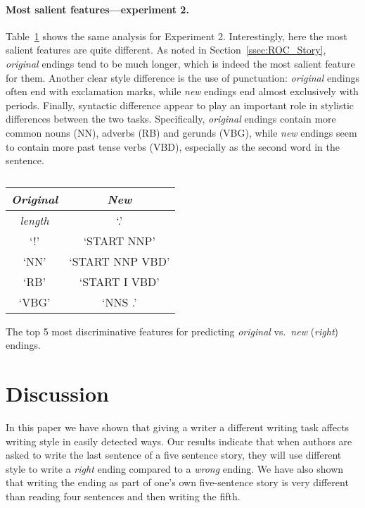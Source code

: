 \documentclass[11pt,a4paper]{article}
\newcommand{\secref}[1]{Section~\ref{ssec:#1}}
\newcommand{\tabref}[1]{Table~\ref{#1}}
\newcommand{\isectionb}[1]{\section{#1}\label{ssec:#1}}
\begin{document}
\paragraph{Most salient features---experiment 2.}
\tabref{exp2_features} shows the same analysis for Experiment 2.
Interestingly, here the most salient features are quite different. 
As noted in \secref{ROC_Story}, {\it original} endings tend to be much longer, which is indeed the most salient feature for them.
Another clear style difference is the use of punctuation: {\it original} endings often end with exclamation marks, while {\it new} endings end almost exclusively with periods. 
Finally, syntactic difference appear to play an important role in stylistic differences between the two tasks. 
Specifically, {\it original} endings contain more common nouns (NN), adverbs (RB) and gerunds (VBG), while {\it new} endings seem to contain more past tense verbs (VBD), especially as the second word in the sentence.


\begin{table}[!t]
\begin{center}
\begin{tabular}{|c|c|} \hline
\textit{\textbf{Original}} & \textit{\textbf{New}}\\ \hline
{\it length} & `.'\\ \hline
`!' & `START NNP'\\ \hline
`NN' & `START NNP VBD'\\ \hline
`RB' & `START I VBD'\\ \hline
`VBG' & `NNS .'\\ \hline

\end{tabular}
\end{center}
\caption{\label{exp2_features}}
The top 5 most discriminative features for predicting {\it original} vs.~{\it new} ({\it right}) endings.\end{table}


\isectionb{Discussion}

In this paper we have shown that giving a writer a different writing
task affects writing style in easily detected ways.
Our results indicate that when authors are asked to write the last
sentence of a five sentence story, they will use different style to
write a {\it right} ending compared to a {\it wrong} ending. We have
also shown that writing the ending as part of one's own five-sentence story is very different than reading four sentences and then writing the fifth.
\end{document}

